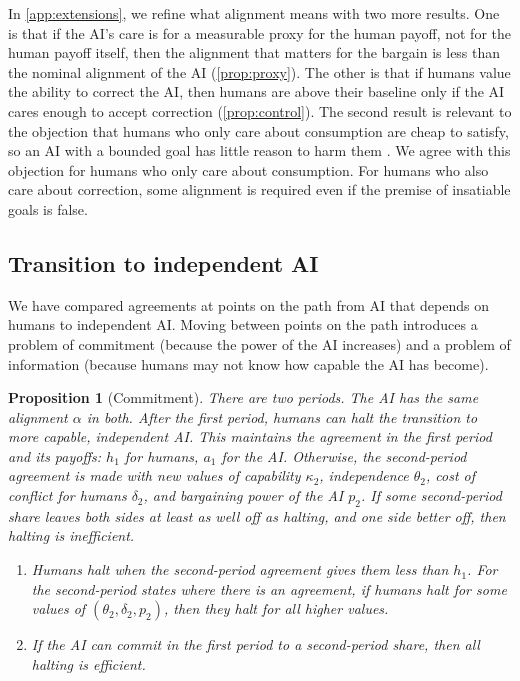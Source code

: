 \documentclass[article, 11pt, reqno]{amsart}
\newtheorem{proposition}[theorem]{Proposition}
\theoremstyle{named}
\theoremstyle{plain}
\begin{document}
In \cref{app:extensions}, we refine what alignment means with two more results. One is that if the AI's care is for a measurable proxy for the human payoff, not for the human payoff itself, then the alignment that matters for the bargain is less than the nominal alignment of the AI (\cref{prop:proxy}). The other is that if humans value the ability to correct the AI, then humans are above their baseline only if the AI cares enough to accept correction (\cref{prop:control}). The second result is relevant to the objection that humans who only care about consumption are cheap to satisfy, so an AI with a bounded goal has little reason to harm them \citep{Barnett2024}. We agree with this objection for humans who only care about consumption. For humans who also care about correction, some alignment is required even if the premise of insatiable goals is false.

\subsection{Transition to independent AI}\label{sec:transition}

We have compared agreements at points on the path from AI that depends on humans to independent AI. Moving between points on the path introduces a problem of commitment (because the power of the AI increases) and a problem of information (because humans may not know how capable the AI has become).

\begin{proposition}[Commitment]\label{prop:commitment}
There are two periods. The AI has the same alignment $\alpha$ in both. After the first period, humans can halt the transition to more capable, independent AI. This maintains the agreement in the first period and its payoffs: $h_1$ for humans, $a_1$ for the AI. Otherwise, the second-period agreement is made with new values of capability $\kappa_2$, independence $\theta_2$, cost of conflict for humans $\delta_2$, and bargaining power of the AI $p_2$. If some second-period share leaves both sides at least as well off as halting, and one side better off, then halting is \emph{inefficient}.
\begin{enumerate}
\item[(i)] Humans halt when the second-period agreement gives them less than $h_1$. For the second-period states where there is an agreement, if humans halt for some values of $(\theta_2, \delta_2, p_2)$, then they halt for all higher values.
\item[(ii)] If the AI can commit in the first period to a second-period share, then all halting is efficient.
\end{enumerate}
\end{proposition}
\end{document}
